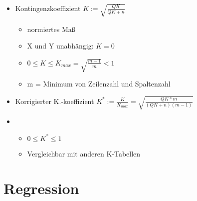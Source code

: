 \documentclass[a4paper]{article}
\begin{document}
\begin{landscape}
\begin{multicols}{4}
\begin{itemize}[noitemsep,nolistsep,leftmargin=*]
\begin{itemize}[noitemsep,nolistsep,leftmargin=*]
        \end{itemize}
        \item Kontingenzkoeffizient $K := \sqrt{\frac{QK}{QK+n}}$
        \begin{itemize}[noitemsep,nolistsep,leftmargin=*]
            \item normiertes Maß
            \item X und Y unabhängig: $K = 0$
            \item $0  \leq K  \leq K_{max} = \sqrt{\frac{m-1}{m}} < 1$
            \item m = Minimum von Zeilenzahl und Spaltenzahl
        \end{itemize}
        \item Korrigierter K.-koeffizient $K^* := \frac{K}{K_{max}} = \sqrt{\frac{QK*m}{(QK+n)(m-1)}}$
        \item \begin{itemize}[noitemsep,nolistsep,leftmargin=*]
            \item $ 0  \leq K^*  \leq 1$
            \item Vergleichbar mit anderen K-Tabellen
        \end{itemize}
    \end{itemize}


  




    \section{Regression}


\end{multicols}
\end{landscape}
\end{document}
